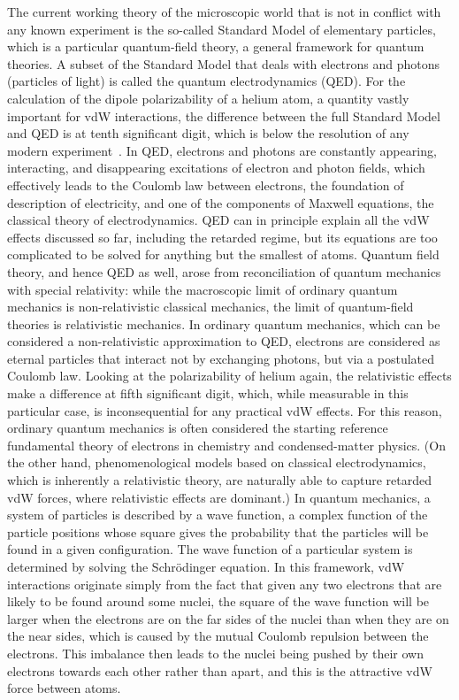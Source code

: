The current working theory of the microscopic world that is not in conflict with any known experiment is the so-called Standard Model of elementary particles, which is a particular quantum-field theory, a general framework for quantum theories.
A subset of the Standard Model that deals with electrons and photons (particles of light) is called the quantum electrodynamics (QED).
For the calculation of the dipole polarizability of a helium atom, a quantity vastly important for vdW interactions, the difference between the full Standard Model and QED is at tenth significant digit, which is below the resolution of any modern experiment~\cite[see][Table 3.1]{Piela07}.
In QED, electrons and photons are constantly appearing, interacting, and disappearing excitations of electron and photon fields, which effectively leads to the Coulomb law between electrons, the foundation of description of electricity, and one of the components of Maxwell equations, the classical theory of electrodynamics.
QED can in principle explain all the vdW effects discussed so far, including the retarded regime, but its equations are too complicated to be solved for anything but the smallest of atoms.
Quantum field theory, and hence QED as well, arose from reconciliation of quantum mechanics with special relativity: while the macroscopic limit of ordinary quantum mechanics is non-relativistic classical mechanics, the limit of quantum-field theories is relativistic mechanics.
In ordinary quantum mechanics, which can be considered a non-relativistic approximation to QED, electrons are considered as eternal particles that interact not by exchanging photons, but via a postulated Coulomb law.
Looking at the polarizability of helium again, the relativistic effects make a difference at fifth significant digit, which, while measurable in this particular case, is inconsequential for any practical vdW effects.
For this reason, ordinary quantum mechanics is often considered the starting reference fundamental theory of electrons in chemistry and condensed-matter physics.
(On the other hand, phenomenological models based on classical electrodynamics, which is inherently a relativistic theory, are naturally able to capture retarded vdW forces, where relativistic effects are dominant.)
In quantum mechanics, a system of particles is described by a wave function, a complex function of the particle positions whose square gives the probability that the particles will be found in a given configuration.
The wave function of a particular system is determined by solving the Schrödinger equation.
In this framework, vdW interactions originate simply from the fact that given any two electrons that are likely to be found around some nuclei, the square of the wave function will be larger when the electrons are on the far sides of the nuclei than when they are on the near sides, which is caused by the mutual Coulomb repulsion between the electrons.
This imbalance then leads to the nuclei being pushed by their own electrons towards each other rather than apart, and this is the attractive vdW force between atoms.

